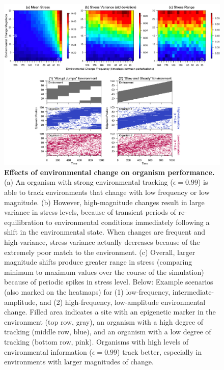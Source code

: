 \documentclass{article}
\begin{document}
\begin{figure}
    \centering
    \includegraphics[width=\textwidth]{Figures/Fig_EnvironmentalSimulationComposite.png}
    \caption{\textbf{Effects of environmental change on organism performance.} (a) An organism with strong environmental tracking ($\epsilon = 0.99$) is able to track environments that change with low frequency or low magnitude. (b) However, high-magnitude changes result in large variance in stress levels, because of transient periods of re-equilibration to environmental conditions immediately following a shift in the environmental state. When changes are frequent and high-variance, stress variance actually decreases because of the extremely poor match to the environment. (c) Overall, larger magnitude shifts produce greater range in stress (comparing minimum to maximum values over the course of the simulation) because of periodic spikes in stress level. Below: Example scenarios (also marked on the heatmaps) for (1) low-frequency, intermediate-amplitude, and (2) high-frequency, low-amplitude environmental change. Filled area indicates a site with an epigenetic marker in the environment (top row, gray), an organism with a high degree of tracking (middle row, blue), and an organism with a low degree of tracking (bottom row, pink). Organisms with high levels of environmental information ($\epsilon = 0.99$) track better, especially in environments with larger magnitudes of change.}
    \label{fig:envirovar}
\end{figure}





\end{document}
